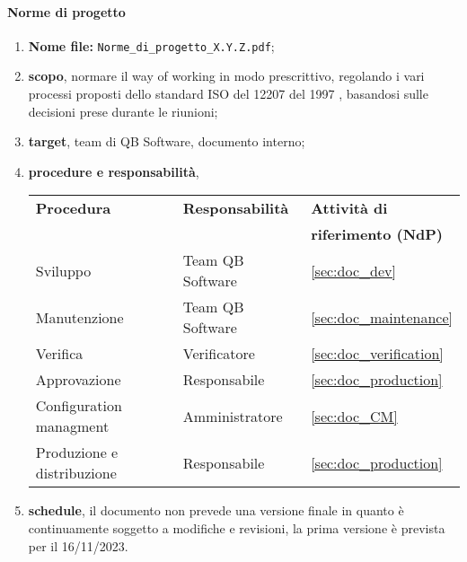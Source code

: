        \paragraph{Norme di progetto}
            \begin{enumerate}
                \item \textbf{Nome file:} \texttt{Norme\_di\_progetto\_X.Y.Z.pdf};
                \item \textbf{scopo}, normare il way of working in modo prescrittivo, regolando i vari processi proposti dello standard ISO del 12207 del 1997 \cite{bib:ISO12207_1997}, basandosi sulle decisioni prese durante le riunioni;
                \item \textbf{target}, team di QB Software, documento interno;
                \item \textbf{procedure e responsabilità},
                \\
                \begin{tabularx}{0.93\textwidth}{|X|X|X|}
                    \hline
                    \textbf{Procedura} & \textbf{Responsabilità} & \textbf{Attività di} \\
                    & & \textbf{riferimento (NdP)} \\
                    \hline
                    Sviluppo & Team QB Software &  \ref{sec:doc_dev}
                    \\\hline
                    Manutenzione & Team QB Software & \ref{sec:doc_maintenance} 
                    \\\hline
                    Verifica & Verificatore & \ref{sec:doc_verification}
                    \\\hline
                    Approvazione & Responsabile & \ref{sec:doc_production}
                    \\\hline
                    Configuration managment & Amministratore & \ref{sec:doc_CM}
                    \\\hline
                    Produzione e distribuzione & Responsabile & \ref{sec:doc_production}
                    \\\hline
                \end{tabularx}
                \item \textbf{schedule}, il documento non prevede una versione finale in quanto è continuamente soggetto a modifiche e revisioni, la prima versione è prevista per il 16/11/2023. 
            \end{enumerate} 

